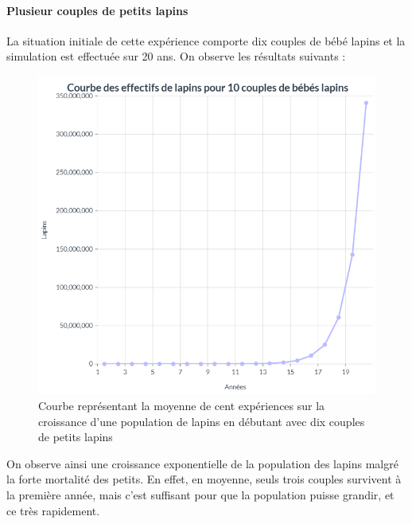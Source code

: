 \documentclass[12pt]{article}
\begin{document}
    \paragraph{Plusieur couples de petits lapins}\hspace{0.5cm}
    \newline
    \par La situation initiale de cette expérience comporte dix couples de bébé lapins et la simulation est effectuée sur 20 ans. On observe les résultats suivants :
    \newpage
    \begin{figure}[!h]
	    \centering
	    
        \includegraphics[scale = 0.8]{Photos/courbes10lapP.png}
        \caption{Courbe représentant la moyenne de cent expériences sur la croissance d'une population de lapins en débutant avec dix couples de petits lapins}
	    \label{fig11}
	\end{figure}
    \par
    On observe ainsi une croissance exponentielle de la population des lapins malgré la forte mortalité des petits. En effet, en moyenne, seuls trois couples survivent à la première année, mais c'est suffisant pour que la population puisse grandir, et ce très rapidement.
\end{document}
